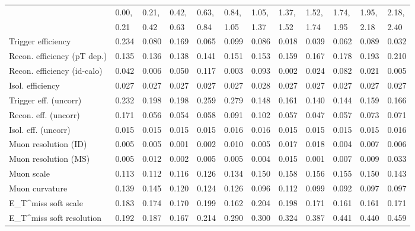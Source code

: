 \begin{tabular}{l|p{0.6cm}p{0.6cm}p{0.6cm}p{0.6cm}p{0.6cm}p{0.6cm}p{0.6cm}p{0.6cm}p{0.6cm}p{0.6cm}p{0.6cm}}
\hline
   & 0.00, & 0.21, & 0.42, & 0.63, & 0.84, & 1.05, & 1.37, & 1.52, & 1.74, & 1.95, & 2.18,  \\ 
   & 0.21 & 0.42 & 0.63 & 0.84 & 1.05 & 1.37 & 1.52 & 1.74 & 1.95 & 2.18 & 2.40  \\ 
\hline
Trigger efficiency                       & 0.234 & 0.080 & 0.169 & 0.065 & 0.099 & 0.086 & 0.018 & 0.039 & 0.062 & 0.089 & 0.032 \\
Recon. efficiency (pT dep.)              & 0.135 & 0.136 & 0.138 & 0.141 & 0.151 & 0.153 & 0.159 & 0.167 & 0.178 & 0.193 & 0.210 \\
Recon. efficiency (id-calo)              & 0.042 & 0.006 & 0.050 & 0.117 & 0.003 & 0.093 & 0.002 & 0.024 & 0.082 & 0.021 & 0.005 \\
Isol. efficiency                         & 0.027 & 0.027 & 0.027 & 0.027 & 0.027 & 0.028 & 0.027 & 0.027 & 0.027 & 0.027 & 0.027 \\
Trigger eff. (uncorr)                    & 0.232 & 0.198 & 0.198 & 0.259 & 0.279 & 0.148 & 0.161 & 0.140 & 0.144 & 0.159 & 0.166 \\
Recon. eff. (uncorr)                     & 0.171 & 0.056 & 0.054 & 0.058 & 0.091 & 0.102 & 0.057 & 0.047 & 0.057 & 0.073 & 0.071 \\
Isol. eff. (uncorr)                      & 0.015 & 0.015 & 0.015 & 0.015 & 0.016 & 0.016 & 0.015 & 0.015 & 0.015 & 0.015 & 0.016 \\
Muon resolution (ID)                     & 0.005 & 0.005 & 0.001 & 0.002 & 0.010 & 0.005 & 0.017 & 0.018 & 0.004 & 0.007 & 0.006 \\
Muon resolution (MS)                     & 0.005 & 0.012 & 0.002 & 0.005 & 0.005 & 0.004 & 0.015 & 0.001 & 0.007 & 0.009 & 0.033 \\
Muon scale                               & 0.113 & 0.112 & 0.116 & 0.126 & 0.134 & 0.150 & 0.158 & 0.156 & 0.155 & 0.150 & 0.143 \\
Muon curvature                           & 0.139 & 0.145 & 0.120 & 0.124 & 0.126 & 0.096 & 0.112 & 0.099 & 0.092 & 0.097 & 0.097 \\
E_{T}^{miss} soft scale                  & 0.183 & 0.174 & 0.170 & 0.199 & 0.162 & 0.204 & 0.198 & 0.171 & 0.161 & 0.161 & 0.171 \\
E_{T}^{miss} soft resolution             & 0.192 & 0.187 & 0.167 & 0.214 & 0.290 & 0.300 & 0.324 & 0.387 & 0.441 & 0.440 & 0.459 \\

\end{tabular}
